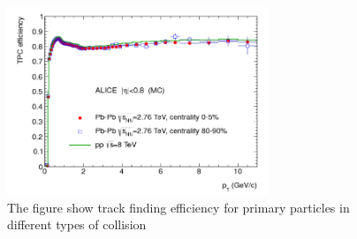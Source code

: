 \documentclass[12pt,a4paper]{book}
\begin{document}
\begin{figure}[h]
	\centering
	\includegraphics[width=0.7\textwidth]{pictures/track_finding_efficiency.png}
	\caption{The figure show track finding efficiency for primary particles in different types of collision \cite{ALICE:2014sbxFs}}
	\label{fig:track_finding_efficiency}
\end{figure}
\end{document}
